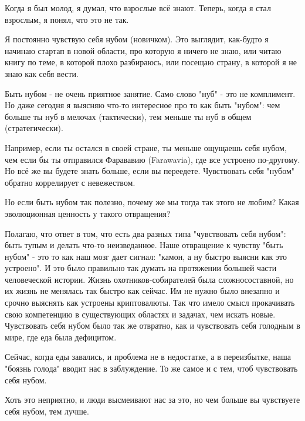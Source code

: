 \documentclass[ebook,12pt,oneside,openany]{memoir}
\author{Пол Грэм} \date{}
\begin{document}
\maketitle

Когда я был молод, я думал, что взрослые всё знают. Теперь, когда я
стал взрослым, я понял, что это не так.

Я постоянно чувствую себя нубом (новичком). Это выглядит, как-будто я
начинаю стартап в новой области, про которую я ничего не знаю, или
читаю книгу по теме, в которой плохо разбираюсь, или посещаю страну, в
которой я не знаю как себя вести.

Быть нубом - не очень приятное занятие. Само слово "нуб" - это не
комплимент. Но даже сегодня я выясняю что-то интересное про то как
быть "нубом": чем больше ты нуб в мелочах (тактически), тем меньше ты
нуб в общем (стратегически).

Например, если ты остался в своей стране, ты меньше ощущаешь себя
нубом, чем если бы ты отправился Фарававию (Farawavia), где все
устроено по-другому. Но всё же вы будете знать больше, если вы
переедете. Чувствовать себя "нубом" обратно коррелирует с невежеством.

Но если быть нубом так полезно, почему же мы тогда так этого не любим?
Какая эволюционная ценность у такого отвращения?

Полагаю, что ответ в том, что есть два разных типа "чувствовать себя
нубом": быть тупым и делать что-то неизведанное. Наше отвращение к
чувству "быть нубом" - это то как наш мозг дает сигнал: "камон, а ну
быстро выясни как это устроено". И это было правильно так думать на
протяжении большей части человеческой истории. Жизнь
охотников-собирателей была сложносоставной, но их жизнь не менялась
так быстро как сейчас. Им не нужно было внезапно и срочно выяснять как
устроены криптовалюты. Так что имело смысл прокачивать свою
компетенцию в существующих областях и задачах, чем искать новые.
Чувствовать себя нубом было так же отвратно, как и чувствовать себя
голодным в мире, где еда была дефицитом.

Сейчас, когда еды завались, и проблема не в недостатке, а в
переизбытке, наша "боязнь голода" вводит нас в заблуждение. То же
самое и с тем, чтоб чувствовать себя нубом.

Хоть это неприятно, и люди высмеивают нас за это, но чем больше вы
чувствуете себя нубом, тем лучше.
\end{document}
